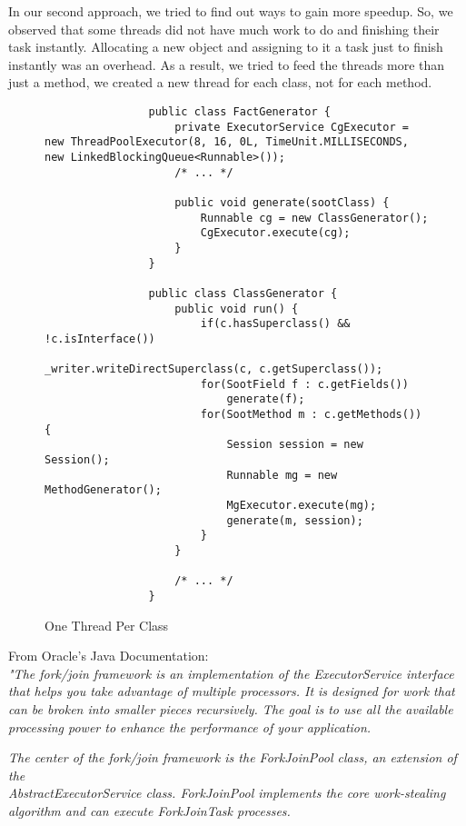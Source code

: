 \documentclass{dithesis}
\begin{document}
        In our second approach, we tried to find out ways to gain more speedup. So, we observed that some threads did not have much work to do and finishing their task instantly. Allocating a new object and assigning to it a task just to finish instantly was an overhead. As a result, we tried to feed the threads more than just a method, we created a new thread for each class, not for each method.  
        \begin{figure}[H]
            \begin{lstlisting}
                public class FactGenerator {
                    private ExecutorService CgExecutor = new ThreadPoolExecutor(8, 16, 0L, TimeUnit.MILLISECONDS, new LinkedBlockingQueue<Runnable>());
                    /* ... */

                    public void generate(sootClass) {
                        Runnable cg = new ClassGenerator();
                        CgExecutor.execute(cg);
                    }
                }

                public class ClassGenerator {
                    public void run() {
                        if(c.hasSuperclass() && !c.isInterface())
                            _writer.writeDirectSuperclass(c, c.getSuperclass());
                        for(SootField f : c.getFields())
                            generate(f);
                        for(SootMethod m : c.getMethods()) {
                            Session session = new Session();
                            Runnable mg = new MethodGenerator();
                            MgExecutor.execute(mg);
                            generate(m, session);
                        }
                    }

                    /* ... */
                }
            \end{lstlisting}
        \caption{One Thread Per Class}
        \end{figure}

        From Oracle's Java Documentation: \\
    	\textit{"The fork/join framework is an implementation of the ExecutorService interface that helps you take advantage of multiple processors. It is designed for work that can be broken into smaller pieces recursively. The goal is to use all the available processing power to enhance the performance of your application.}
    	 
		\textit{The center of the fork/join framework is the ForkJoinPool class, an extension of the \\ AbstractExecutorService class. ForkJoinPool implements the core work-stealing algorithm and can execute ForkJoinTask processes.}
    	 
\end{document}
